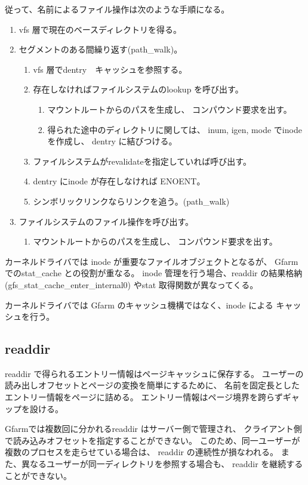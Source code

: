 	従って、名前によるファイル操作は次のような手順になる。

	\begin{enumerate}
	\item	vfs 層で現在のベースディレクトリを得る。
	\item	セグメントのある間繰り返す(path_walk)。
		\begin{enumerate}
		\item	vfs 層でdentry　キャッシュを参照する。
		\item	存在しなければファイルシステムのlookup を呼び出す。
			\begin{enumerate}
			\item	マウントルートからのパスを生成し、
				コンパウンド要求を出す。
			\item	得られた途中のディレクトリに関しては、
				inum, igen, mode でinode を作成し、
				dentry に結びつける。
			\end{enumerate}
		\item	ファイルシステムがrevalidateを指定していれば呼び出す。
		\item	dentry にinode が存在しなければ ENOENT。
		\item	シンボリックリンクならリンクを追う。(path_walk)
		\end{enumerate}
	\item	ファイルシステムのファイル操作を呼び出す。
		\begin{enumerate}
		\item	マウントルートからのパスを生成し、
			コンパウンド要求を出す。
		\end{enumerate}
	\end{enumerate}


	カーネルドライバでは inode が重要なファイルオブジェクトとなるが、
	Gfarm でのstat_cache との役割が重なる。
	inode 管理を行う場合、readdir の結果格納(gfs_stat_cache_enter_internal0)
	やstat 取得関数が異なってくる。

	カーネルドライバでは Gfarm のキャッシュ機構ではなく、inode による
	キャッシュを行う。
	
\subsection{readdir}
	readdir で得られるエントリー情報はページキャッシュに保存する。
	ユーザーの読み出しオフセットとページの変換を簡単にするために、
	名前を固定長としたエントリー情報をページに詰める。
	エントリー情報はページ境界を跨らずギャップを設ける。

	Gfarmでは複数回に分かれるreaddir はサーバー側で管理され、
	クライアント側で読み込みオフセットを指定することができない。
	このため、同一ユーザーが複数のプロセスを走らせている場合は、
	readdir の連続性が損なわれる。
	また、異なるユーザーが同一ディレクトリを参照する場合も、
	readdir を継続することができない。

